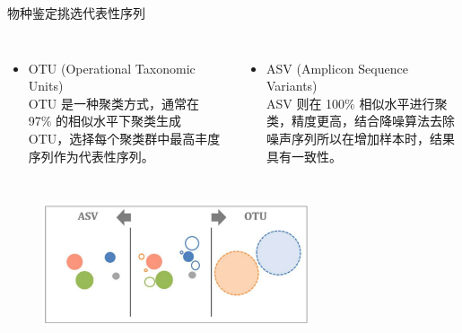 \documentclass[UTF8]{ctexbeamer}
\begin{document}
	\begin{frame}{物种鉴定}{挑选代表性序列}
		\begin{columns}
			\begin{itemize}
				\item OTU {\tiny (Operational Taxonomic Units)} \\ \qquad OTU 是一种聚类方式，通常在 97\% 的相似水平下聚类生成 OTU，选择每个聚类群中最高丰度序列作为代表性序列。
			\end{itemize}

			\begin{itemize}
				\item ASV {\tiny (Amplicon Sequence Variants)} \\ \qquad ASV 则在 100\% 相似水平进行聚类，精度更高，结合降噪算法去除噪声序列所以在增加样本时，结果具有一致性。
			\end{itemize}
		\end{columns}

		\begin{figure}
			\centering
			\includegraphics[width=0.7\textwidth]{img/OTUvsASV.png}
		\end{figure}
	\end{frame}

\end{document}
